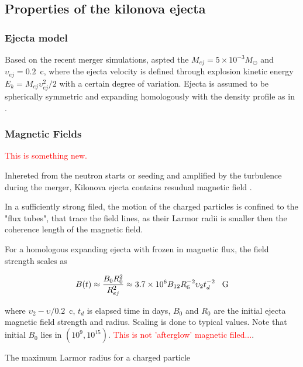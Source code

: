 \documentclass[11pt,a4paper,headinclude=true,DIV=14,BCOR=8mm,chapterprefix,listof=totoc,twoside,openright,abstracton]{scrbook}
\newcommand{\red}[1]{\textcolor{red}{#1}}
\begin{document}

\subsection{Properties of the kilonova ejecta}

\subsubsection{Ejecta model}

Based on the recent merger simulations, aspted the $M_{ej}=5\times10^{-3}M_{\odot}$ and $\upsilon_{ej}=0.2$~c, where the ejecta velocity is defined through explosion kinetic energy $E_{k} = M_{ej} \upsilon_{ej}^2 / 2 $ with a certain degree of variation. 
Ejecta is assumed to be spherically symmetric and expanding homologously with the density profile as in \cite{Barnes & Kasen (2013)}. 


\subsubsection{Magnetic Fields}
\red{This is something new.}

Inhereted from the neutron starts or seeding and amplified by the turbulence during the merger, Kilonova ejecta contains resudual magnetic field \cite{(Kiuchi et al. 2014, 2015)}. 

In a sufficiently strong filed, the motion of the charged particles is confined to the "flux tubes", that trace the field lines, as their Larmor radii is smaller then the coherence length of the magnetic field. 

For a homologous expanding ejecta with frozen in magnetic flux, the field strength scales as 

\begin{equation}
    B(t) \approx \frac{B_0 R_0 ^2}{R_{ej}^2} \approx 3.7 \times 10^{6} B_{12} R_{6}^{-2} \upsilon_{2} t_d^{-2} \hspace{3mm} \text{G}
\end{equation}

where $\upsilon_2 - \upsilon/0.2$~c, $t_d$ is elapsed time in days, $B_0$ and $R_0$ are the initial ejecta magnetic field strength and radius. Scaling is done to typical values. Note that initial $B_0$ lies in $(10^{9},10^{15})$. \red{This is not 'afterglow' magnetic filed...}.

The maximum Larmor radius for a charged particle 
\end{document}
